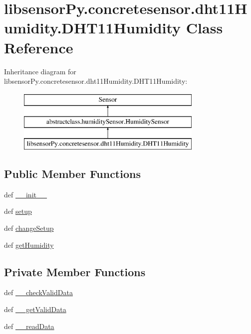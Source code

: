 \hypertarget{classlibsensorPy_1_1concretesensor_1_1dht11Humidity_1_1DHT11Humidity}{}\section{libsensor\+Py.\+concretesensor.\+dht11\+Humidity.\+D\+H\+T11\+Humidity Class Reference}
\label{classlibsensorPy_1_1concretesensor_1_1dht11Humidity_1_1DHT11Humidity}
Inheritance diagram for libsensor\+Py.\+concretesensor.\+dht11\+Humidity.\+D\+H\+T11\+Humidity\+:\begin{figure}[H]
\begin{center}
\leavevmode
\includegraphics[height=3.000000cm]{classlibsensorPy_1_1concretesensor_1_1dht11Humidity_1_1DHT11Humidity}
\end{center}
\end{figure}
\subsection*{Public Member Functions}
\begin{DoxyCompactItemize}
\item 
def \hyperlink{classlibsensorPy_1_1concretesensor_1_1dht11Humidity_1_1DHT11Humidity_af4971de0c81a64712de651f346f60382}{\+\_\+\+\_\+init\+\_\+\+\_\+}
\item 
def \hyperlink{classlibsensorPy_1_1concretesensor_1_1dht11Humidity_1_1DHT11Humidity_a1cf73cff592ce13369cce5d0cc284133}{setup}
\item 
def \hyperlink{classlibsensorPy_1_1concretesensor_1_1dht11Humidity_1_1DHT11Humidity_a01713d9dd8d913fc6ece26ab594cb80a}{change\+Setup}
\item 
def \hyperlink{classlibsensorPy_1_1concretesensor_1_1dht11Humidity_1_1DHT11Humidity_ab98bc236d0dd0f083b980276071dafc4}{get\+Humidity}
\end{DoxyCompactItemize}
\subsection*{Private Member Functions}
\begin{DoxyCompactItemize}
\item 
def \hyperlink{classlibsensorPy_1_1concretesensor_1_1dht11Humidity_1_1DHT11Humidity_aaf5bdcb37cf41e21b648301c35c748cc}{\+\_\+\+\_\+check\+Valid\+Data}
\item 
def \hyperlink{classlibsensorPy_1_1concretesensor_1_1dht11Humidity_1_1DHT11Humidity_ae42abed1b53e3f783f704ce7208a66d0}{\+\_\+\+\_\+get\+Valid\+Data}
\item 
def \hyperlink{classlibsensorPy_1_1concretesensor_1_1dht11Humidity_1_1DHT11Humidity_a7a1af6c1699e5c10d3e6b7713c059339}{\+\_\+\+\_\+read\+Data}
\end{DoxyCompactItemize}

